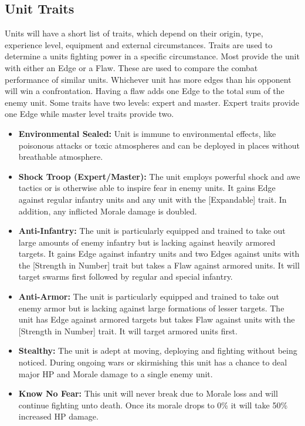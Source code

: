 \subsection{Unit Traits}
Units will have a short list of traits, which depend on their origin, type, experience level, equipment and external circumstances.
Traits are used to determine a units fighting power in a specific circumstance. 
Most provide the unit with either an Edge or a Flaw. 
These are used to compare the combat performance of similar units.
Whichever unit has more edges than his opponent will win a confrontation.
Having a flaw adds one Edge to the total sum of the enemy unit.
Some traits have two levels: expert and master. 
Expert traits provide one Edge while master level traits provide two.
\begin{itemize}
	\item \textbf{Environmental Sealed:} Unit is immune to environmental effects, like poisonous attacks or toxic atmospheres and can be deployed in places without breathable atmosphere.
	\item \textbf{Shock Troop (Expert/Master):} The unit employs powerful shock and awe tactics or is otherwise able to inspire fear in enemy units. It gains Edge against regular infantry units and any unit with the [Expandable] trait. In addition, any inflicted Morale damage is doubled.
	\item \textbf{Anti-Infantry:} The unit is particularly equipped and trained to take out large amounts of enemy infantry but is lacking against heavily armored targets. It gains Edge against infantry units and two Edges against units with the [Strength in Number] trait but takes a Flaw against armored units. It will target swarms first followed by regular and special infantry.
	\item \textbf{Anti-Armor:} The unit is particularly equipped and trained to take out enemy armor but is lacking against large formations of lesser targets. The unit has Edge against armored targets but takes Flaw against units with the [Strength in Number] trait. It will target armored units first.
	\item \textbf{Stealthy:} The unit is adept at moving, deploying and fighting without being noticed. During ongoing wars or skirmishing this unit has a chance to deal major HP and Morale damage to a single enemy unit.
	\item \textbf{Know No Fear:} This unit will never break due to Morale loss and will continue fighting unto death. Once its morale drops to 0\% it will take 50\% increased HP damage.

\end{itemize}

